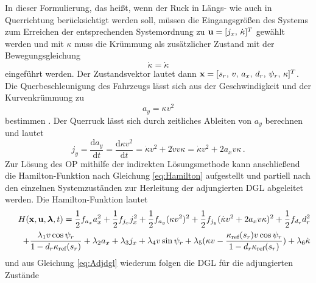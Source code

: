 In dieser Formulierung, das heißt, wenn der Ruck in Längs- wie auch in Querrichtung berücksichtigt werden soll, müssen die Eingangsgrößen des Systems zum Erreichen der entsprechenden Systemordnung zu $\boldsymbol{\mathrm{u}} = [j_x,\,\dot{\kappa}]^T$ gewählt werden und mit $\kappa$ muss die Krümmung als zusätzlicher Zustand mit der Bewegungsgleichung 
\begin{equation}
	\dot{\kappa} = \dot{\kappa} \label{eq:dotkappa}
\end{equation}
eingeführt werden. Der Zustandsvektor lautet dann $\boldsymbol{\mathrm{x}} = [s_r,\,v,\,a_x,\,d_r,\,\psi_r,\,\kappa]^T$. Die Querbeschleunigung des Fahrzeugs lässt sich aus der Geschwindigkeit und der Kurvenkrümmung zu 
\begin{equation}
	a_y = \kappa v^2 \label{eq:ay}
\end{equation}
bestimmen \cite{Schramm.2013}. Der Querruck lässt sich durch zeitliches Ableiten von $a_y$ berechnen und lautet
\begin{equation}
j_y = \frac{\textrm{d} a_y}{\textrm{d} t} = \frac{\textrm{d} \kappa v^2}{\textrm{d} t} = \dot{\kappa}v^2 + 2\dot{v}v\kappa  = \dot{\kappa}v^2 + 2a_xv\kappa\,. \label{eq:jy}
\end{equation}
Zur Lösung des \gls{OP} mithilfe der indirekten Lösungsmethode kann anschließend die Hamilton-Funktion nach Gleichung \eqref{eq:Hamilton} aufgestellt und partiell nach den einzelnen Systemzuständen zur Herleitung der adjungierten \gls{DGL} abgeleitet werden. Die Hamilton-Funktion lautet
\begin{equation}
\begin{split}
H(\boldsymbol{\mathrm{x}},\boldsymbol{\mathrm{u}},\boldsymbol{\mathrm{\lambda}},t) = \frac{1}{2}f_{a_x} a_x^2 + \frac{1}{2}f_{j_x} j_x^2 + \frac{1}{2}f_{a_y} (\kappa v^2)^2 + \frac{1}{2}f_{j_y} (\dot{\kappa}v^2 + 2a_xv\kappa)^2 + \frac{1}{2}f_{d_r} d_r^2 \\
\qquad + \frac{\lambda_1v\cos{\psi_r}}{1-d_r\kappa_{\textrm{ref}}(s_r)} + \lambda_2a_x + \lambda_3j_x + \lambda_4v\sin{\psi_r} + \lambda_5(\kappa v - \frac{\kappa_{\textrm{ref}}(s_r) v\cos{\psi_r}}{1-d_r\kappa_{\textrm{ref}}(s_r)}) + \lambda_6\dot{\kappa} \label{eq:Hamilton_eingesetzt}
\end{split}
\end{equation}
und aus Gleichung \eqref{eq:Adjdgl} wiederum folgen die \gls{DGL} für die adjungierten Zustände

